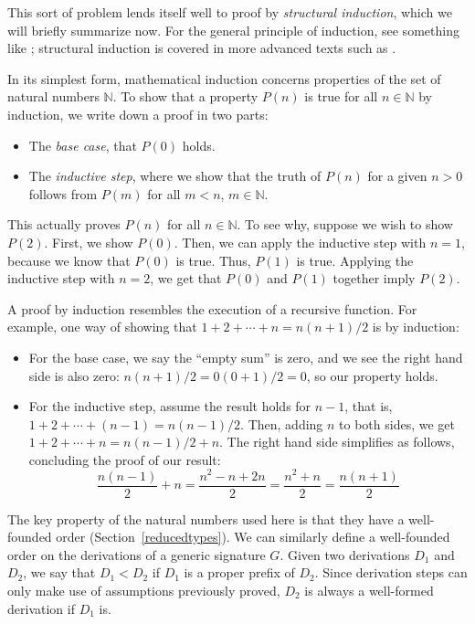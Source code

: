 \documentclass[../generics]{subfiles}
\begin{document}
This sort of problem lends itself well to proof by \emph{structural induction}, which we will briefly summarize now. For the general principle of induction, see something like \cite{grimaldi}; structural induction is covered in more advanced texts such as \cite{bradley2007calculus}.

In its simplest form, mathematical induction concerns properties of the set of natural numbers $\mathbb{N}$. To show that a property $P(n)$ is true for all $n\in\mathbb{N}$ by induction, we write down a proof in two parts:
\begin{itemize}
\item The \emph{base case}, that $P(0)$ holds.
\item The \emph{inductive step}, where we show that the truth of $P(n)$ for a given $n>0$ follows from $P(m)$ for all $m<n$, $m\in\mathbb{N}$.
\end{itemize}
This actually proves $P(n)$ for all $n\in\mathbb{N}$. To see why, suppose we wish to show $P(2)$. First, we show $P(0)$. Then, we can apply the inductive step with $n=1$, because we know that $P(0)$ is true. Thus, $P(1)$ is true. Applying the inductive step with $n=2$, we get that $P(0)$ and $P(1)$ together imply $P(2)$.

\begin{example}
A proof by induction resembles the execution of a recursive function. For example, one way of showing that $1+2+\cdots+n=n(n+1)/2$ is by induction:
\begin{itemize}
\item For the base case, we say the ``empty sum'' is zero, and we see the right hand side is also zero: $n(n+1)/2=0(0+1)/2=0$, so our property holds.
\item For the inductive step, assume the result holds for $n-1$, that is, $1+2+\cdots+(n-1)=n(n-1)/2$. Then, adding $n$ to both sides, we get $1+2+\cdots+n=n(n-1)/2+n$. The right hand side simplifies as follows, concluding the proof of our result:
\[\frac{n(n-1)}{2}+n=\frac{n^2-n+2n}{2}=\frac{n^2+n}{2}=\frac{n(n+1)}{2}\]
\end{itemize}
\end{example}

The key property of the natural numbers used here is that they have a well-founded order (Section~\ref{reducedtypes}). We can similarly define a well-founded order on the derivations of a generic signature $G$. Given two derivations $D_1$ and $D_2$, we say that $D_1<D_2$ if $D_1$ is a proper prefix of $D_2$. Since derivation steps can only make use of assumptions previously proved, $D_2$ is always a well-formed derivation if $D_1$ is.
\end{document}
